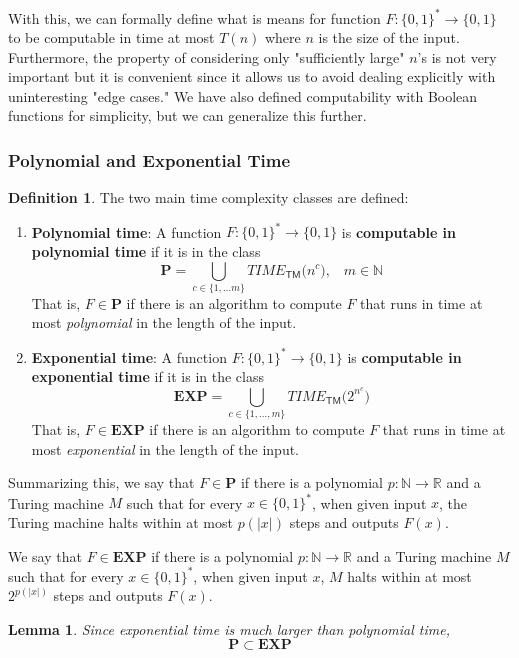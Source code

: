 \documentclass[a4paper, 12pt]{report}
\newtheorem{lemma}[theorem]{Lemma}
\theoremstyle{remark}
\theoremstyle{definition}
\newtheorem{definition}{Definition}[section]
\begin{document}
With this, we can formally define what is means for function $F: \{0,1\}^* \longrightarrow \{0,1\}$ to be computable in time at most $T(n)$ where $n$ is the size of the input. Furthermore, the property of considering only "sufficiently large" $n$'s is not very important but it is convenient since it allows us to avoid dealing explicitly with uninteresting "edge cases." We have also defined computability with Boolean functions for simplicity, but we can generalize this further. 

\subsubsection{Polynomial and Exponential Time}
\begin{definition}
The two main time complexity classes are defined: 
\begin{enumerate}
    \item \textbf{Polynomial time}: A function $F: \{0,1\}^* \longrightarrow \{0,1\}$ is \textbf{computable in polynomial time} if it is in the class
    \[\mathbf{P} = \bigcup_{c \in \{1, ...m\}} TIME_{\mathsf{TM}} \big( n^c \big), \;\;\; m \in \mathbb{N}\]
    That is, $F \in \mathbf{P}$ if there is an algorithm to compute $F$ that runs in time at most \textit{polynomial} in the length of the input. 
    \item \textbf{Exponential time}: A function $F: \{0,1\}^* \longrightarrow \{0,1\}$ is \textbf{computable in exponential time} if it is in the class 
    \[\mathbf{EXP} = \bigcup_{c \in \{1, ..., m\}} TIME_{\mathsf{TM}} \big( 2^{n^c}\big)\]
    That is, $F \in \mathbf{EXP}$ if there is an algorithm to compute $F$ that runs in time at most \textit{exponential} in the length of the input. 
\end{enumerate}
Summarizing this, we say that $F \in \mathbf{P}$ if there is a polynomial $p: \mathbb{N} \longrightarrow \mathbb{R}$ and a Turing machine $M$ such that for every $x \in \{0,1\}^*$, when given input $x$, the Turing machine halts within at most $p(|x|)$ steps and outputs $F(x)$. 

We say that $F \in \mathbf{EXP}$ if there is a polynomial $p: \mathbb{N} \longrightarrow \mathbb{R}$ and a Turing machine $M$ such that for every $x \in \{0,1\}^*$, when given input $x$, $M$ halts within at most $2^{p(|x|)}$ steps and outputs $F(x)$. 
\end{definition}

\begin{lemma}
Since exponential time is much larger than polynomial time, 
\[\mathbf{P} \subset \mathbf{EXP}\]
\end{lemma}
\end{document}
